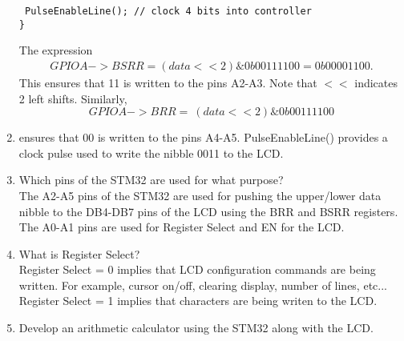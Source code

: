 \begin{enumerate}[label=\arabic*.,ref=\theenumi]
\begin{lstlisting}
 PulseEnableLine(); // clock 4 bits into controller
}
\end{lstlisting}
The expression
\begin{align}
GPIOA->BSRR = (data << 2) \& 0b00111100 
= 0b00001100.  
\end{align}
This ensures that 11 is written to the pins A2-A3.  Note that $<<$ indicates 2 left shifts. Similarly, 
\begin{equation}
GPIOA->BRR = ~(data << 2) \& 0b00111100
\end{equation}
\item ensures that 00 is written to the pins A4-A5. PulseEnableLine() provides a clock pulse used
to write the nibble 0011 to the LCD.
\item Which pins of the STM32 are used for what purpose?
\\
\solution The A2-A5 pins of the STM32 are used for pushing the upper/lower data nibble to the DB4-DB7 pins
of the LCD using the BRR and BSRR registers.   The A0-A1 pins are used for Register Select and EN for the LCD.
\item What is Register Select?
\\
\solution Register Select = 0 implies that LCD configuration commands are being written. For example, cursor on/off, clearing
display, number of lines, etc... Register Select = 1 implies that
characters are being writen to the LCD.
\item Develop an arithmetic calculator using the STM32 along with the LCD.
\end{enumerate}
